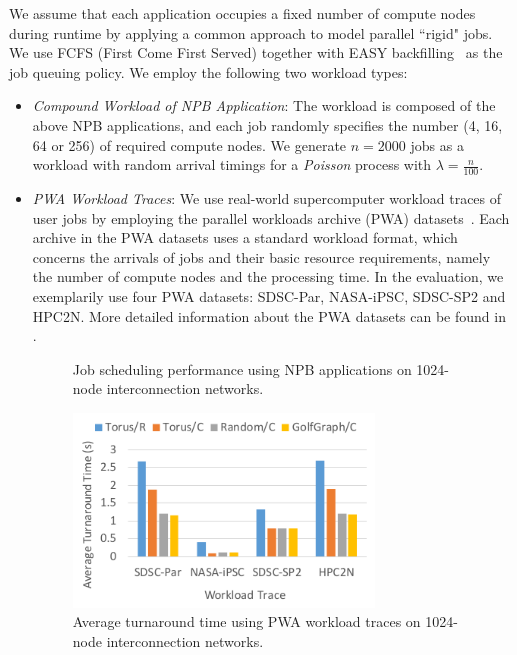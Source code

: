 \documentclass[conference]{IEEEtran}
\begin{document}
We assume that each application occupies a fixed number of compute nodes during runtime by applying a common approach to model parallel ``rigid" jobs.
We use FCFS (First Come First Served) together with EASY backfilling~\cite{easy} as the job queuing policy.
We employ the following two workload types:
\begin{itemize}
\item 
\emph{Compound Workload of NPB Application}: 
The workload is composed of the above NPB applications, and each job randomly specifies the number (4, 16, 64 or 256) of required compute nodes.
We generate $n = 2000$ jobs as a workload with random arrival timings for a \emph{Poisson} process with $\lambda = \frac{n}{100}$. 
\item 
\emph{PWA Workload Traces}: 
We use real-world supercomputer workload traces of user jobs by employing the parallel workloads archive (PWA) datasets~\cite{PWA}. 
Each archive in the PWA datasets uses a standard workload format, which concerns the arrivals of jobs and their basic resource requirements, namely the number of compute nodes and the processing time. 
In the evaluation, we exemplarily use four PWA datasets: SDSC-Par, NASA-iPSC, SDSC-SP2 and HPC2N.
More detailed information about the PWA datasets can be found in \cite{pwa2014}.

\begin{figure}[tb]
	\centering
	\caption{Job scheduling performance using NPB applications on 1024-node interconnection networks.}
	\label{fig:npb} 
\end{figure}

\begin{figure}[tb]
	\centering
	\includegraphics[width=8cm]{ps/pwa-time.pdf}
	\caption{Average turnaround time using PWA workload traces on 1024-node interconnection networks.}
	\label{fig:pwa-time}
\end{figure}


\end{itemize}
\end{document}

